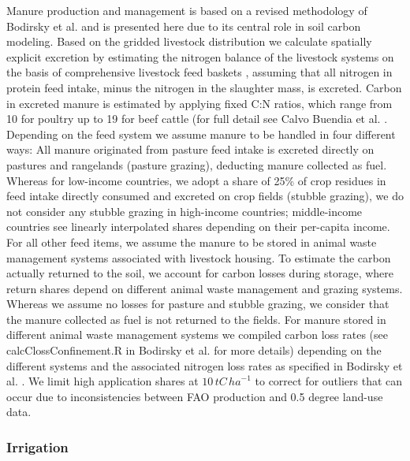 \documentclass[gc, manuscript]{copernicus}
\begin{document}
Manure production and management is based on a revised methodology of Bodirsky et al. \citeyearpar{bodirsky_n2o_2012} and is presented here due to its central role in soil carbon modeling. Based on the gridded livestock distribution we calculate spatially explicit excretion by estimating the nitrogen balance of the livestock systems on the basis of comprehensive livestock feed baskets \citep{weindl_livestock_2017}, assuming that all nitrogen in protein feed intake, minus the nitrogen in the slaughter mass, is excreted. Carbon in excreted manure is estimated by applying fixed C:N ratios, which range from 10 for poultry up to 19 for beef cattle (for full detail see Calvo Buendia et al. \citeyearpar{ogle_cropland_in_ipcc_2019}.
Depending on the feed system we assume manure to be handled in four different ways:
All manure originated from pasture feed intake is excreted directly on pastures and rangelands (pasture grazing), deducting manure collected as fuel.
Whereas for low-income countries, we adopt a share of 25\% of crop residues in feed intake directly consumed and excreted on crop fields (stubble grazing), we do not consider any stubble grazing in high-income countries; middle-income countries see linearly interpolated shares depending on their per-capita income.
For all other feed items, we assume the manure to be stored in animal waste management systems associated with livestock housing.
To estimate the carbon actually returned to the soil, we account for carbon losses during storage, where return shares depend on different animal waste management and grazing systems. Whereas we assume no losses for pasture and stubble grazing, we consider that the manure collected as fuel is not returned to the fields. For manure stored in different animal waste management systems we compiled carbon loss rates (see calcClossConfinement.R in Bodirsky et al. \citeyearpar{bodirsky_mrcommons_2020} for more details) depending on the different systems and the associated nitrogen loss rates as specified in Bodirsky et al. \citeyearpar{bodirsky_n2o_2012}. We limit high application shares at \(10\,\unit{tC\,ha}^{-1}\) to correct for outliers that can occur due to inconsistencies between FAO production and 0.5 degree land-use data.

\hypertarget{sec:irrigation}{%
\subsubsection{Irrigation}\label{sec:irrigation}}
\end{document}
